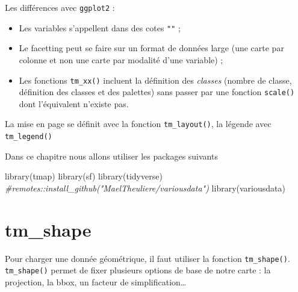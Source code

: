 \documentclass[
]{book}
\newenvironment{Shaded}{\begin{snugshade}}{\end{snugshade}}
\newcommand{\CommentTok}[1]{\textcolor[rgb]{0.56,0.35,0.01}{\textit{#1}}}
\newcommand{\FunctionTok}[1]{\textcolor[rgb]{0.00,0.00,0.00}{#1}}
\newcommand{\NormalTok}[1]{#1}
\providecommand{\tightlist}{%
  \setlength{\itemsep}{0pt}\setlength{\parskip}{0pt}}
\begin{document}
Les différences avec \texttt{ggplot2} :

\begin{itemize}
\tightlist
\item
  Les variables s'appellent dans des cotes \texttt{""} ;
\item
  Le facetting peut se faire sur un format de données large (une carte par colonne et non une carte par modalité d'une variable) ;
\item
  Les fonctions \texttt{tm\_xx()} incluent la définition des \emph{classes} (nombre de classe, définition des classes et des palettes) sans passer par une fonction \texttt{scale()} dont l'équivalent n'existe pas.
\end{itemize}

La mise en page se définit avec la fonction \texttt{tm\_layout()}, la légende avec \texttt{tm\_legend()}

Dans ce chapitre nous allons utiliser les packages suivants

\begin{Shaded}
\begin{Highlighting}[]
\FunctionTok{library}\NormalTok{(tmap)}
\FunctionTok{library}\NormalTok{(sf)}
\FunctionTok{library}\NormalTok{(tidyverse)}
\CommentTok{\#remotes::install\_github("MaelTheuliere/variousdata")}
\FunctionTok{library}\NormalTok{(variousdata)}
\end{Highlighting}
\end{Shaded}

\hypertarget{tm_shape}{%
\section{tm\_shape}\label{tm_shape}}

Pour charger une donnée géométrique, il faut utiliser la fonction \texttt{tm\_shape()}. \texttt{tm\_shape()} permet de fixer plusieurs options de base de notre carte : la projection, la bbox, un facteur de simplification\ldots{}
\end{document}
